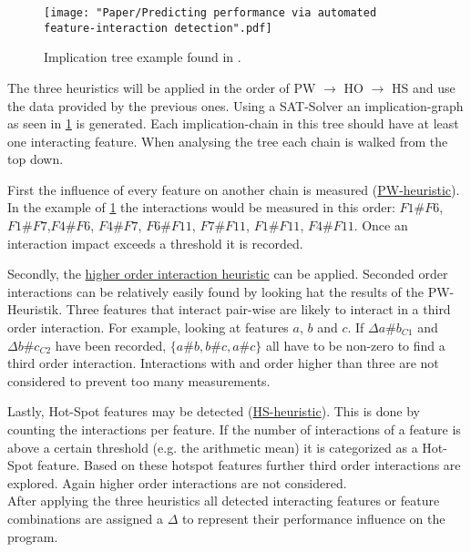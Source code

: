 \begin{figure}[t]
	\centering
	\texttt{[image: "Paper/Predicting performance via automated feature-interaction detection".pdf]}
	\captionsetup{width=0.95\linewidth}
	\caption{Implication tree example found in \cite{AutomatedFeatureDetectionSiegmund2012}. }
	\label{fig:ImplicationTree}
\end{figure}



The three heuristics will be applied in the order of PW $\rightarrow$ HO $\rightarrow$ HS and use the data provided by the previous ones. Using a SAT-Solver an implication-graph as seen in \cref{fig:ImplicationTree} is generated. Each implication-chain in this tree should have at least one interacting feature. When analysing the tree each chain is walked from the top down.

First the influence of every feature on another chain is measured (\hyperref[lab:PW]{PW-heuristic}). In the example of \cref{fig:ImplicationTree} the interactions would be measured in this order: $F1\#F6$,$ F1\#F7$,$ F4\#F6$, $F4\#F7$, $F6\#F11$, $F7\#F11$, $F1\#F11$, $F4\#F11$. Once an interaction impact exceeds a threshold it is recorded.

Secondly, the \hyperref[lab:HO]{higher order interaction heuristic} can be applied. Seconded order interactions can be relatively easily found by looking hat the results of the PW-Heuristik. Three features that interact pair-wise are likely to interact in a third order interaction. For example, looking at features $a$, $b$ and $c$. If $\Delta a\#b_{C1}$ and $\Delta b\#c_{C2}$ have been recorded, $\{a\#b, b\#c, a\#c\}$ all have to be non-zero to find a third order interaction. Interactions with and order higher than three are not considered to prevent too many measurements.

Lastly, Hot-Spot features may be detected (\hyperref[lab:HS]{HS-heuristic}). This is done by counting the interactions per feature. If the number of interactions of a feature is above a certain threshold (e.g. the arithmetic mean) it is categorized as a Hot-Spot feature. Based on these hotspot features further third order interactions are explored. Again higher order interactions are not considered. \\
After applying the three heuristics all detected interacting features or feature combinations are assigned a $\Delta$ to represent their performance influence on the program.

